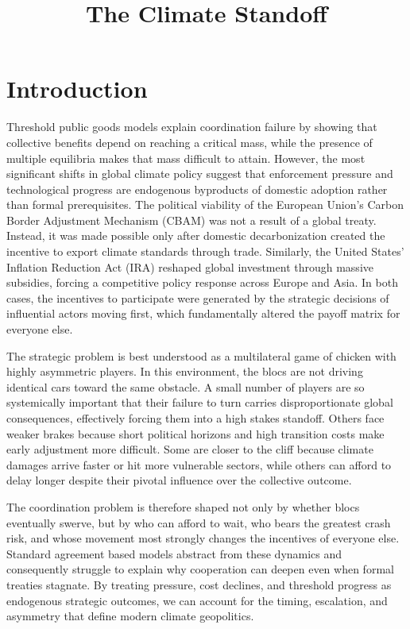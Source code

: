 \documentclass[12pt,a4paper]{article}
\title{\LARGE\textbf{The Climate Standoff}}
\author{}
\date{}
\begin{document}
\maketitle
\thispagestyle{empty}
\newpage

\section*{Introduction}

Threshold public goods models explain coordination failure by showing that collective benefits depend on reaching a critical mass, while the presence of multiple equilibria makes that mass difficult to attain. However, the most significant shifts in global climate policy suggest that enforcement pressure and technological progress are endogenous byproducts of domestic adoption rather than formal prerequisites. The political viability of the European Union's Carbon Border Adjustment Mechanism (CBAM) was not a result of a global treaty. Instead, it was made possible only after domestic decarbonization created the incentive to export climate standards through trade. Similarly, the United States' Inflation Reduction Act (IRA) reshaped global investment through massive subsidies, forcing a competitive policy response across Europe and Asia. In both cases, the incentives to participate were generated by the strategic decisions of influential actors moving first, which fundamentally altered the payoff matrix for everyone else.

The strategic problem is best understood as a multilateral game of chicken with highly asymmetric players. In this environment, the blocs are not driving identical cars toward the same obstacle. A small number of players are so systemically important that their failure to turn carries disproportionate global consequences, effectively forcing them into a high stakes standoff. Others face weaker brakes because short political horizons and high transition costs make early adjustment more difficult. Some are closer to the cliff because climate damages arrive faster or hit more vulnerable sectors, while others can afford to delay longer despite their pivotal influence over the collective outcome.

The coordination problem is therefore shaped not only by whether blocs eventually swerve, but by who can afford to wait, who bears the greatest crash risk, and whose movement most strongly changes the incentives of everyone else. Standard agreement based models abstract from these dynamics and consequently struggle to explain why cooperation can deepen even when formal treaties stagnate. By treating pressure, cost declines, and threshold progress as endogenous strategic outcomes, we can account for the timing, escalation, and asymmetry that define modern climate geopolitics.
\end{document}

